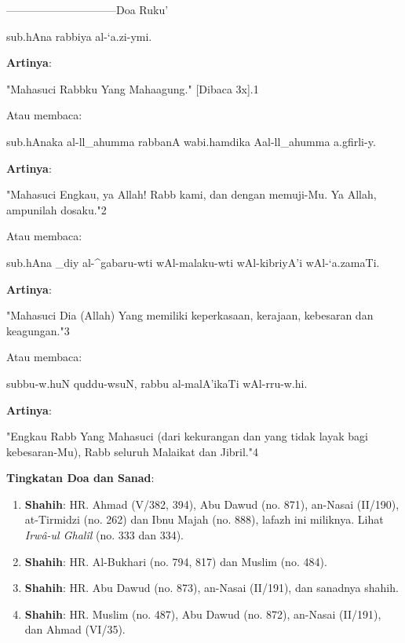 \documentclass[a4paper,12pt]{article}
\begin{document}
\par
{}------------------------------Doa Ruku'
\begin{arabtext}
\noindent
sub.hAna rabbiya al-`a.zi-ymi.\\
\end{arabtext}
\noindent
\textbf{Artinya}:
\par
\indent
"Mahasuci Rabbku Yang Mahaagung." [Dibaca 3x].{\scriptsize 1}\\
\par
\indent
Atau membaca:
\begin{arabtext}
\noindent
sub.hAnaka al-ll_ahumma rabbanA wabi.hamdika Aal-ll_ahumma a.gfirli-y.\\
\end{arabtext}
\noindent
\textbf{Artinya}:
\par
\indent
"Mahasuci Engkau, ya Allah! Rabb kami, dan dengan memuji-Mu. Ya Allah, 
ampunilah dosaku."{\scriptsize 2}\\
\par
\indent
Atau membaca:
\begin{arabtext}
\noindent
sub.hAna _diy al-^gabaru-wti wAl-malaku-wti wAl-kibriyA'i wAl-`a.zamaTi.\\
\end{arabtext}
\noindent
\textbf{Artinya}:
\par
\indent
"Mahasuci Dia (Allah) Yang memiliki keperkasaan, kerajaan, kebesaran dan 
keagungan."{\scriptsize 3}\\
\par
\indent
Atau membaca:
\begin{arabtext}
\noindent
subbu-w.huN quddu-wsuN, rabbu al-malA'ikaTi wAl-rru-w.hi.\\
\end{arabtext}
\noindent
\textbf{Artinya}:
\par
\indent
"Engkau Rabb Yang Mahasuci (dari kekurangan dan yang tidak layak bagi 
kebesaran-Mu), Rabb seluruh Malaikat dan Jibril."{\scriptsize 4}\\
\par
\noindent
\textbf{Tingkatan Doa dan Sanad}: 
\begin{enumerate}
\item \textbf{Shahih}: HR. Ahmad (V/382, 394), Abu Dawud (no. 871), 
an-Nasai (II/190), at-Tirmidzi (no. 262) dan Ibnu Majah (no. 888), lafazh 
ini miliknya. Lihat \textit{Irw\^{a}-ul Ghal\^{i}l} (no. 333 dan 334).
\item \textbf{Shahih}: HR. Al-Bukhari (no. 794, 817) dan Muslim (no. 484).
\item \textbf{Shahih}: HR. Abu Dawud (no. 873), an-Nasai (II/191), dan 
sanadnya shahih.
\item \textbf{Shahih}: HR. Muslim (no. 487), Abu Dawud (no. 872), an-Nasai 
(II/191), dan Ahmad (VI/35).\\\\
\end{enumerate}
\end{document}
